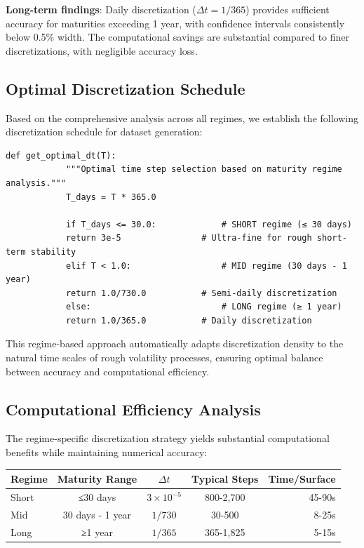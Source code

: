 	\textbf{Long-term findings}: Daily discretization ($\Delta t = 1/365$) provides sufficient accuracy for maturities exceeding 1 year, with confidence intervals consistently below 0.5\% width. The computational savings are substantial compared to finer discretizations, with negligible accuracy loss.
	
	\subsection{Optimal Discretization Schedule}
	
	Based on the comprehensive analysis across all regimes, we establish the following discretization schedule for dataset generation:
	
	\begin{lstlisting}[style=cleanpy]
		def get_optimal_dt(T):
			"""Optimal time step selection based on maturity regime analysis."""
			T_days = T * 365.0
			
			if T_days <= 30.0:             # SHORT regime (≤ 30 days)
			return 3e-5                # Ultra-fine for rough short-term stability
			elif T < 1.0:                  # MID regime (30 days - 1 year)
			return 1.0/730.0           # Semi-daily discretization  
			else:                          # LONG regime (≥ 1 year)
			return 1.0/365.0           # Daily discretization
	\end{lstlisting}
	
	This regime-based approach automatically adapts discretization density to the natural time scales of rough volatility processes, ensuring optimal balance between accuracy and computational efficiency.
	
	\subsection{Computational Efficiency Analysis}
	
	The regime-specific discretization strategy yields substantial computational benefits while maintaining numerical accuracy:
	
	\begin{center}
		\begin{tabular}{@{}lcccr@{}}
			\toprule
			\textbf{Regime} & \textbf{Maturity Range} & \textbf{$\Delta t$} & \textbf{Typical Steps} & \textbf{Time/Surface} \\
			\midrule
			Short & ≤30 days & $3 \times 10^{-5}$ & 800-2,700 & 45-90s \\
			Mid & 30 days - 1 year & $1/730$ & 30-500 & 8-25s \\
			Long & ≥1 year & $1/365$ & 365-1,825 & 5-15s \\
			\bottomrule
		\end{tabular}
	\end{center}
	
